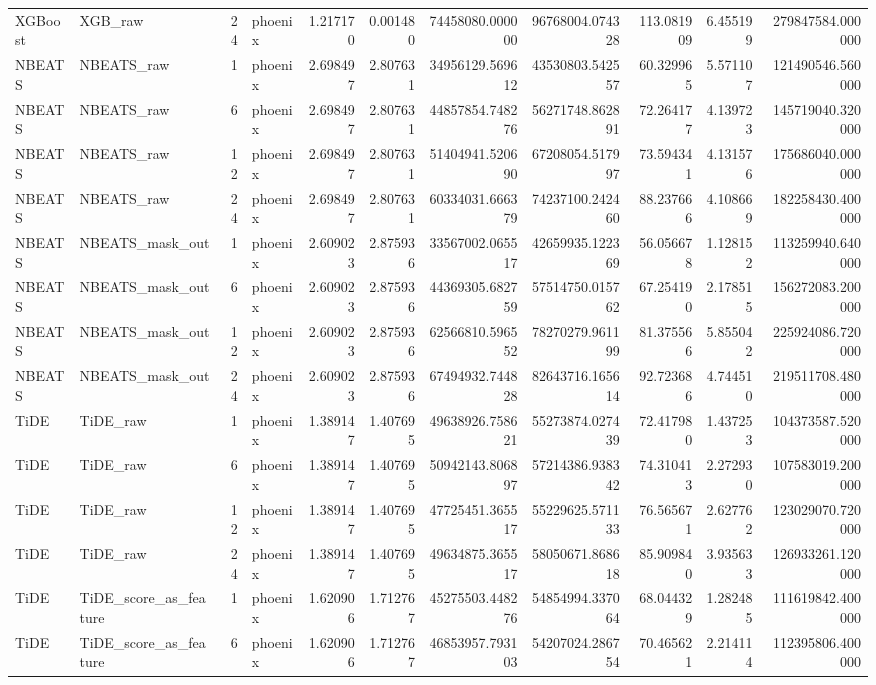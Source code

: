 \begin{longtable}{llrlrrrrrrr}
XGBoost & XGB\_raw & 24 & phoenix & 1.217170 & 0.001480 & 74458080.000000 & 96768004.074328 & 113.081909 & 6.455199 & 279847584.000000 \\
NBEATS & NBEATS\_raw & 1 & phoenix & 2.698497 & 2.807631 & 34956129.569612 & 43530803.542557 & 60.329965 & 5.571107 & 121490546.560000 \\
NBEATS & NBEATS\_raw & 6 & phoenix & 2.698497 & 2.807631 & 44857854.748276 & 56271748.862891 & 72.264177 & 4.139723 & 145719040.320000 \\
NBEATS & NBEATS\_raw & 12 & phoenix & 2.698497 & 2.807631 & 51404941.520690 & 67208054.517997 & 73.594341 & 4.131576 & 175686040.000000 \\
NBEATS & NBEATS\_raw & 24 & phoenix & 2.698497 & 2.807631 & 60334031.666379 & 74237100.242460 & 88.237666 & 4.108669 & 182258430.400000 \\
NBEATS & NBEATS\_mask\_out & 1 & phoenix & 2.609023 & 2.875936 & 33567002.065517 & 42659935.122369 & 56.056678 & 1.128152 & 113259940.640000 \\
NBEATS & NBEATS\_mask\_out & 6 & phoenix & 2.609023 & 2.875936 & 44369305.682759 & 57514750.015762 & 67.254190 & 2.178515 & 156272083.200000 \\
NBEATS & NBEATS\_mask\_out & 12 & phoenix & 2.609023 & 2.875936 & 62566810.596552 & 78270279.961199 & 81.375566 & 5.855042 & 225924086.720000 \\
NBEATS & NBEATS\_mask\_out & 24 & phoenix & 2.609023 & 2.875936 & 67494932.744828 & 82643716.165614 & 92.723686 & 4.744510 & 219511708.480000 \\
TiDE & TiDE\_raw & 1 & phoenix & 1.389147 & 1.407695 & 49638926.758621 & 55273874.027439 & 72.417980 & 1.437253 & 104373587.520000 \\
TiDE & TiDE\_raw & 6 & phoenix & 1.389147 & 1.407695 & 50942143.806897 & 57214386.938342 & 74.310413 & 2.272930 & 107583019.200000 \\
TiDE & TiDE\_raw & 12 & phoenix & 1.389147 & 1.407695 & 47725451.365517 & 55229625.571133 & 76.565671 & 2.627762 & 123029070.720000 \\
TiDE & TiDE\_raw & 24 & phoenix & 1.389147 & 1.407695 & 49634875.365517 & 58050671.868618 & 85.909840 & 3.935633 & 126933261.120000 \\
TiDE & TiDE\_score\_as\_feature & 1 & phoenix & 1.620906 & 1.712767 & 45275503.448276 & 54854994.337064 & 68.044329 & 1.282485 & 111619842.400000 \\
TiDE & TiDE\_score\_as\_feature & 6 & phoenix & 1.620906 & 1.712767 & 46853957.793103 & 54207024.286754 & 70.465621 & 2.214114 & 112395806.400000 \\

\end{longtable}
